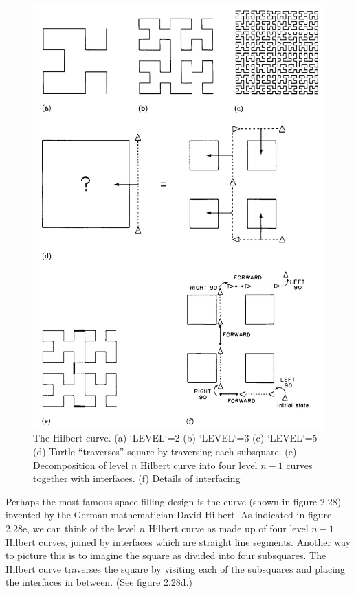 \documentclass{book}
\begin{document}
\begin{figure}
\begin{center}
\includegraphics[scale=1]{fig2-28}
\caption{The Hilbert curve. (a) \textsc{`LEVEL`}=2 (b) \textsc{`LEVEL`}=3 (c) \textsc{`LEVEL`}=5 (d) Turtle ``traverses'' square by traversing each subsquare. (e) Decomposition of level $n$ Hilbert curve into four level $n - 1$ curves together with interfaces. (f) Details of interfacing}
\end{center}
\end{figure}

Perhaps the most famous space-filling design is the curve (shown in
figure 2.28) invented by the German mathematician David Hilbert. As
indicated in figure 2.28e, we can think of the level $n$ Hilbert curve as
made up of four level $n - 1$ Hilbert curves, joined by interfaces which
are straight line segments. Another way to picture this is to imagine the
square as divided into four subsquares. The Hilbert curve traverses the
square by visiting each of the subsquares and placing the interfaces in
between. (See figure 2.28d.)
\end{document}
